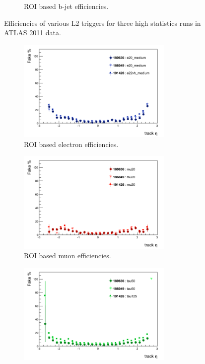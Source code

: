 \begin{figure}[htbp]
\begin{subfigure}{.5\linewidth}
		\caption{ROI based b-jet efficiencies.}
		\label{fig:trig_2011_L2_eta_g}
	\end{subfigure}
	\caption{Efficiencies of various L2 triggers for three high statistics runs in ATLAS 2011 data.}
	\label{fig:trig_2011_L2_eta}
\end{figure}

\clearpage

\begin{figure}[htbp]
	\begin{subfigure}{.5\linewidth}
		\centering
		\includegraphics[width=75mm]{f/e20_medium_IDTrkNoCut_eta_EF_fake}
		\caption{ROI based electron efficiencies.}
		\label{fig:trig_2011_EF_eta_a}
	\end{subfigure}
	\begin{subfigure}{.5\linewidth}	
		\centering
		\includegraphics[width=75mm]{f/mu20_IDTrkNoCut_eta_EF_fake}
		\caption{ROI based muon efficiencies.}
		\label{fig:trig_2011_EF_eta_c}
	\end{subfigure}
	\begin{subfigure}{.5\linewidth}	
		\centering
		\includegraphics[width=75mm]{f/tau50_IDTrkNoCut_eta_EF_fake}

\end{subfigure}
\end{figure}
